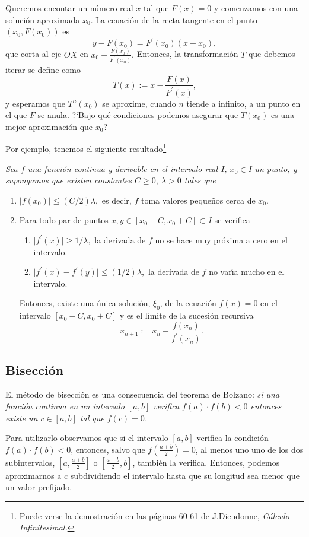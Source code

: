 Queremos encontar un n\'umero real $x$ tal que $F(x)=0$ y comenzamos con una
soluci\'on aproximada $x_0$.
La ecuaci\'on de la recta tangente en el punto $(x_0,F(x_0))$ es 
\[y-F(x_0)=F^{\prime}(x_0)(x-x_0),\]
que corta al eje $OX$ en $x_0-\frac{F(x_0)}{F^{\prime}(x_0)}.$ Entonces, la
transformaci\'on $T$ que debemos iterar se define como
\[T(x):=x-\frac{F(x)}{F^{\prime}(x)},\]
\noindent y esperamos que $T^n(x_0)$ se aproxime, cuando $n$ tiende a infinito, 
a un punto en el que $F$ se anula. ?`Bajo qu\'e condiciones podemos asegurar que
$T(x_0)$ es una mejor aproximaci\'on que $x_0$?

Por ejemplo, tenemos el siguiente resultado\footnote{Puede verse la
demostraci\'on en las p\'aginas 60-61 de J.Dieudonne, {\itshape C\'alculo
Infinitesimal.}}

{\itshape Sea $f$ una funci\'on continua y derivable en el intervalo real $I$,
$x_0\in I$ un punto,  y supongamos que existen constantes $C\ge 0,\ \lambda>0$
tales que 
\begin{enumerate}
 \item $\vert f(x_0)\vert \le (C/2)\lambda,$ es decir, $f$ toma valores
peque\~nos cerca de $x_0$. 
 \item Para todo par de puntos $x,y\in [x_0-C,x_0+C]\subset I$ se verifica
 \begin{enumerate}
  \item $\vert f^{\prime}(x)\vert\ge 1/\lambda,$ la derivada de $f$ no se hace
muy pr\'oxima a cero en el intervalo.
  \item $\vert f^{\prime}(x)-f^{\prime}(y)\vert\le (1/2)\lambda, $ la derivada
de $f$ no var\'{\i}a mucho en el intervalo. 
 \end{enumerate}
Entonces, existe una \'unica soluci\'on,  $\xi_0$, de la ecuaci\'on $f(x)=0$ en
el intervalo $[x_0-C,x_0+C]$ y es el l\'{\i}mite de la sucesi\'on recursiva 
\[x_{n+1}:=x_n-\frac{f(x_n)}{f^{\prime}(x_n)}.\]
\end{enumerate}
}




\subsection{Bisecci\'on}

El m\'etodo de bisecci\'on es una consecuencia del teorema de Bolzano: {\itshape
si una funci\'on continua en un intervalo $[a,b]$ verifica $f(a)\cdot f(b)<0$
entonces existe un $c\in [a,b]$ tal que $f(c)=0$. }

Para utilizarlo observamos que si el intervalo $[a,b]$ verifica la condici\'on
$f(a)\cdot f(b)<0$, entonces, salvo que $f(\frac{a+b}{2})=0$,  al menos uno uno
de los dos subintervalos, $[a,\frac{a+b}{2}]$ o $[\frac{a+b}{2},b]$, tambi\'en
la verifica. Entonces, podemos aproximarnos a $c$ subdividiendo el intervalo
hasta que su longitud  sea menor que un valor prefijado. 



